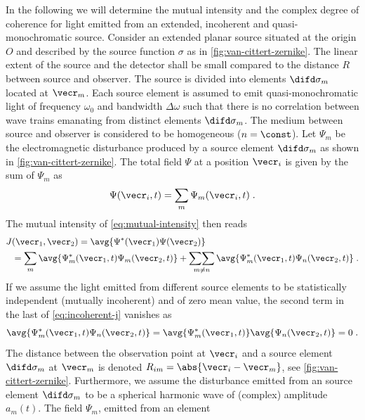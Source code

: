 \documentclass[
twoside,
openright,
titlepage,
numbers=noenddot,
headinclude,
fleqn,
a4paper,
footinclude=true,
cleardoublepage=empty,
abstractoff,
BCOR=5mm,
paper=a4,
fontsize=11pt,
british,ngerman,american,
]{scrreprt}
\begin{document}
In the following we will determine the mutual intensity and the
complex degree of coherence for light emitted from an extended,
incoherent and quasi-monochromatic source.  Consider an extended
planar source situated at the origin $O$ and described by the source
function $\sigma$ as in \cref{fig:van-cittert-zernike}.  The linear
extent of the source and the detector shall be small compared to the
distance $R$ between source and observer.  The source is divided
into elements $\difd\sigma_m$ located at $\vecr_m$.  Each source
element is assumed to emit quasi-monochromatic light of frequency
$\omega_0$ and bandwidth $\Delta\omega$ such that there is no
correlation between wave trains emanating from distinct elements
$\difd\sigma_m$.  The medium between source and observer is considered
to be homogeneous ($n=\const$).  Let $\Psi_m$ be the electromagnetic
disturbance produced by a source element $\difd\sigma_m$ as shown in
\cref{fig:van-cittert-zernike}.  The total field $\Psi$ at a position
$\vecr_i$ is given by the sum of $\Psi_m$ as
\begin{equation}
  \label{eq:total-field}
  \Psi(\vecr_i,t) = \sum_m \Psi_m(\vecr_i,t) \;.
\end{equation}
The mutual intensity of \cref{eq:mutual-intensity} then reads
\begin{equation}
  \label{eq:incoherent-j}
  \begin{split}
      J&(\vecr_1,\vecr_2) = \avg{\Psi^*(\vecr_1)\Psi(\vecr_2)} 
      \\ &= \sum_m \avg{\Psi^*_m(\vecr_1,t)\Psi_m(\vecr_2,t)} 
      + \mathop{\sum\!\sum}_{m\neq n} 
      \avg{\Psi^*_m(\vecr_1,t)\Psi_n(\vecr_2,t)} \;.
  \end{split}
\end{equation}
If we assume the light emitted from different source elements to be
statistically independent (mutually incoherent) and of zero mean
value, the second term in the last of \cref{eq:incoherent-j} vanishes
as
\begin{equation}
  \label{eq:uncorrealted-fields}
  \avg{\Psi^*_m(\vecr_1,t)\Psi_n(\vecr_2,t)} 
  = \avg{\Psi^*_m(\vecr_1,t)}\avg{\Psi_n(\vecr_2,t)} 
  = 0 \;.
\end{equation}
The distance between the observation point at $\vecr_i$ and a source
element $\difd\sigma_m$ at $\vecr_m$ is denoted $R_{i
  m}=\abs{\vecr_i-\vecr_m}$, see \cref{fig:van-cittert-zernike}.
Furthermore, we assume the disturbance emitted from an source element
$\difd\sigma_m$ to be a spherical harmonic wave of (complex)
amplitude $a_m(t)$.  The field $\Psi_m$, emitted from an element
\end{document}
